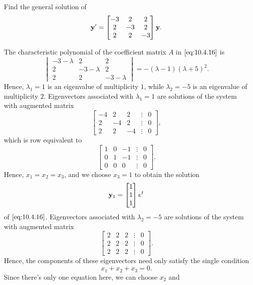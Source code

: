\documentclass{ximera}
\begin{document}
\begin{example}\label{example:10.4.3}
 Find the general solution of
\begin{equation}\label{eq:10.4.16}
{\bf y}'=\begin{bmatrix}-3&2&2\\
2&-3&2\\2&2&-3
\end{bmatrix}{\bf y}.
\end{equation}


\begin{explanation} The characteristic polynomial of
the  coefficient matrix $A$ in  $\eqref{eq:10.4.16}$ is
$$
\begin{vmatrix}-3-\lambda&2&2\\2&-3-\lambda&2\\2&2
&-3-\lambda\end{vmatrix}=-(\lambda-1)(\lambda+5)^2.
$$
Hence, $\lambda_1=1$ is an eigenvalue of multiplicity $1$, while
$\lambda_2=-5$ is an eigenvalue of multiplicity $2$. Eigenvectors
associated with $\lambda_1=1$ are solutions of the system with
augmented matrix
$$
\begin{bmatrix}-4&2&2&\vdots&0\\
2
&-4&2&\vdots&0\\2&2&-4&
\vdots&0\end{bmatrix}, $$
which is row equivalent to
$$
\begin{bmatrix} 1&0&-1&\vdots& 0\\0&1&-1 &\vdots& 0
\\0&0&0&\vdots&0\end{bmatrix}.
$$
Hence, $x_1=x_2=x_3$, and we choose $x_3=1$ to obtain the solution
\begin{equation}\label{eq:10.4.17}
{\bf y}_1=\begin{bmatrix}1\\1\\1\end{bmatrix}e^t
\end{equation}
of  $\eqref{eq:10.4.16}$.  Eigenvectors associated with $\lambda_2=-5$
are solutions of the system
with  augmented matrix
$$
\begin{bmatrix} 2&2&2&\vdots&0\\2&2&2&\vdots&0
\\2&2&2&\vdots&0\end{bmatrix}.
$$
Hence, the components of these eigenvectors need only satisfy the single
condition
$$
x_1+x_2+x_3=0.
$$
Since there's only one equation here, we can choose $x_2$ and

\end{explanation}
\end{example}
\end{document}
